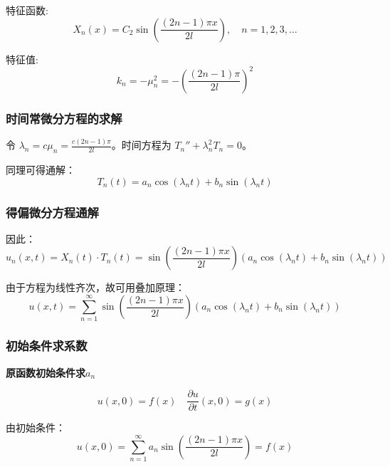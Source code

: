 \documentclass[12pt,a4paper]{article}
\numberwithin{subsection}{section}
\numberwithin{subsubsection}{subsection}
\theoremstyle{plain}
\theoremstyle{definition}
\theoremstyle{remark}
\begin{document}
	特征函数:
	\begin{equation}
		X_n(x) = C_2 \sin\left(\frac{(2n-1)\pi x}{2l}\right), \quad n = 1, 2, 3, \ldots
	\end{equation}
	
	特征值:
	\begin{equation}
		k_n = -\mu_n^2 = -\left(\frac{(2n-1)\pi}{2l}\right)^2
	\end{equation}
	
	\subsubsection{时间常微分方程的求解}
	令 $\lambda_n = c \mu_n = \frac{c(2n-1)\pi}{2l}$。时间方程为 $T_n'' + \lambda_n^2 T_n = 0$。
	
	同理可得通解：
	\begin{equation}
		T_n(t) = a_n \cos(\lambda_n t) + b_n \sin(\lambda_n t)
	\end{equation}
	
	\subsubsection{得偏微分方程通解}
	因此：
	\begin{equation}
		u_n(x, t) = X_n(t) \cdot T_n(t) = \sin\left(\frac{(2n-1)\pi x}{2l}\right) \left( a_n \cos(\lambda_n t) + b_n \sin(\lambda_n t) \right)
	\end{equation}
	
	由于方程为线性齐次，故可用叠加原理：
	\begin{equation}
		u(x, t) = \sum_{n=1}^{\infty} \sin\left(\frac{(2n-1)\pi x}{2l}\right) \left( a_n \cos(\lambda_n t) + b_n \sin(\lambda_n t) \right)
	\end{equation}
	
	\subsubsection{初始条件求系数}
	\noindent
	\textbf{原函数初始条件求$a_n$}
	
	\begin{equation}
		u(x, 0) = f(x) \quad \frac{\partial u}{\partial t}(x, 0) = g(x)
	\end{equation}
	
	由初始条件：
	\begin{equation}
		u(x, 0) = \sum_{n=1}^{\infty} a_n \sin\left(\frac{(2n-1)\pi x}{2l}\right) = f(x)
	\end{equation}
	
\end{document}
